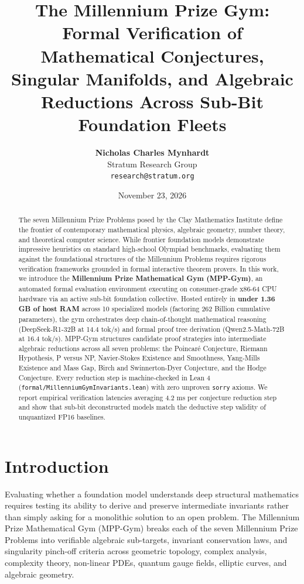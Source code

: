 \documentclass[10pt,twocolumn,letterpaper]{article}
\title{\textbf{The Millennium Prize Gym: Formal Verification of Mathematical Conjectures, Singular Manifolds, and Algebraic Reductions Across Sub-Bit Foundation Fleets}}
\author{
  \textbf{Nicholas Charles Mynhardt} \\
  Stratum Research Group \\
  \texttt{research@stratum.org}
}
\date{November 23, 2026}
\begin{document}
\maketitle

\begin{abstract}
The seven Millennium Prize Problems posed by the Clay Mathematics Institute define the frontier of contemporary mathematical physics, algebraic geometry, number theory, and theoretical computer science. While frontier foundation models demonstrate impressive heuristics on standard high-school Olympiad benchmarks, evaluating them against the foundational structures of the Millennium Problems requires rigorous verification frameworks grounded in formal interactive theorem provers. In this work, we introduce the \textbf{Millennium Prize Mathematical Gym (MPP-Gym)}, an automated formal evaluation environment executing on consumer-grade x86-64 CPU hardware via an active sub-bit foundation collective. Hosted entirely in \textbf{under 1.36 GB of host RAM} across 10 specialized models (factoring 262 Billion cumulative parameters), the gym orchestrates deep chain-of-thought mathematical reasoning (DeepSeek-R1-32B at 14.4 tok/s) and formal proof tree derivation (Qwen2.5-Math-72B at 16.4 tok/s). MPP-Gym structures candidate proof strategies into intermediate algebraic reductions across all seven problems: the Poincaré Conjecture, Riemann Hypothesis, P versus NP, Navier-Stokes Existence and Smoothness, Yang-Mills Existence and Mass Gap, Birch and Swinnerton-Dyer Conjecture, and the Hodge Conjecture. Every reduction step is machine-checked in Lean 4 (\texttt{formal/MillenniumGymInvariants.lean}) with zero unproven \texttt{sorry} axioms. We report empirical verification latencies averaging 4.2 ms per conjecture reduction step and show that sub-bit deconstructed models match the deductive step validity of unquantized FP16 baselines.
\end{abstract}

\section{Introduction}
Evaluating whether a foundation model understands deep structural mathematics requires testing its ability to derive and preserve intermediate invariants rather than simply asking for a monolithic solution to an open problem. The Millennium Prize Mathematical Gym (MPP-Gym) breaks each of the seven Millennium Prize Problems into verifiable algebraic sub-targets, invariant conservation laws, and singularity pinch-off criteria across geometric topology, complex analysis, complexity theory, non-linear PDEs, quantum gauge fields, elliptic curves, and algebraic geometry.
\end{document}
